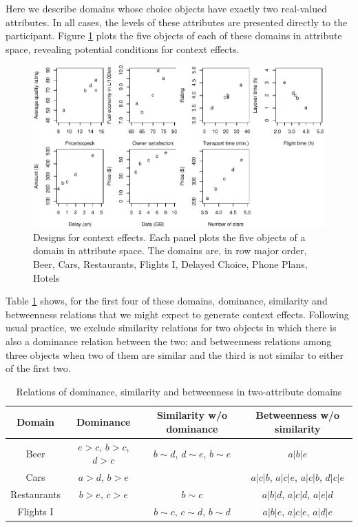 \documentclass[11pt,letter]{article}
\begin{document}
Here we describe domains whose choice objects have exactly two real-valued attributes.
In all cases, the levels of these attributes are presented directly to the participant.
Figure \ref{f:CE} plots the five objects of each of these domains in attribute space, revealing potential conditions for context effects.

\begin{figure}
	\caption{Designs for context effects. Each panel plots the five objects of a domain in attribute space. The domains are, in row major order, Beer, Cars, Restaurants, Flights I, Delayed Choice, Phone Plans, Hotels}\label{f:CE}
	\centering
	\includegraphics[width=15cm]{./Figures/design_patterns.pdf}
\end{figure}

Table \ref{t:CE} shows, for the first four of these domains, dominance, similarity and betweenness relations that we might expect to generate context effects.
Following usual practice, we exclude similarity relations for two objects in which there is also a dominance relation between the two; and betweenness relations among three objects when two of them are similar and the third is not similar to either of the first two.

\begin{table}
	\centering
	\begin{tabular}{cccc}
		Domain & Dominance & Similarity w/o dominance & Betweenness w/o similarity \\
		\hline
		Beer
		& $e>c$, $b>c$, $d>c$ & $b \sim d$, $d \sim e$, $b \sim e$
		& $a|b|e$ \\
		Cars
		& $a>d$, $b>e$ & & $a|c|b$, $a|c|e$, $a|c|b$, $d|c|e$ \\
		Restaurants
		& $b>e$, $c>e$ & $b \sim c$ & $a|b|d$, $a|c|d$, $a|e|d$ \\
		Flights I 
		& & $b \sim c$, $c \sim d$, $b \sim d$ & $a|b|e$, $a|c|e$, $a|d|e$ \\
		\hline
	\end{tabular}\caption{Relations of dominance, similarity and betweenness in two-attribute domains}\label{t:CE}
\end{table}
\end{document}
